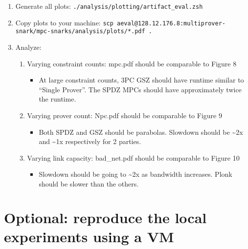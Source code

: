 \begin{enumerate}
\def\labelenumi{\arabic{enumi}.}
\tightlist
\item
  Generate all plots: \texttt{./analysis/plotting/artifact\_eval.zsh}
\item
  Copy plots to your machine:
  \texttt{scp\ \textquotesingle{}aeval@128.12.176.8:multiprover-snark/mpc-snarks/analysis/plots/*.pdf\textquotesingle{}\ .}
\item
  Analyze:

  \begin{enumerate}
  \def\labelenumii{\arabic{enumii}.}
  \tightlist
  \item
    Varying constraint counts: mpc.pdf should be comparable to Figure 8

    \begin{itemize}
    \tightlist
    \item
      At large constraint counts, 3PC GSZ should have runtime similar to
      ``Single Prover''. The SPDZ MPCs should have approximately twice
      the runtime.
    \end{itemize}
  \item
    Varying prover count: Npc.pdf should be comparable to Figure 9

    \begin{itemize}
    \tightlist
    \item
      Both SPDZ and GSZ should be parabolas. Slowdown should be
      \textasciitilde2x and \textasciitilde1x respectively for 2
      parties.
    \end{itemize}
  \item
    Varying link capacity: bad\_net.pdf should be comparable to Figure
    10

    \begin{itemize}
    \tightlist
    \item
      Slowdown should be going to \textasciitilde2x as bandwidth
      increases. Plonk should be slower than the others.
    \end{itemize}
  \end{enumerate}
\end{enumerate}

\hypertarget{optional-reproduce-the-local-experiments-using-a-vm}{%
\section{Optional: reproduce the local experiments using a
VM}\label{optional-reproduce-the-local-experiments-using-a-vm}}

